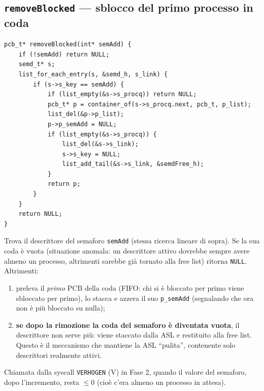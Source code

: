 \documentclass[11pt,a4paper]{article}
\newcommand{\code}[1]{\texttt{#1}}
\newcommand{\func}[1]{\textbf{\texttt{#1}}}
\begin{document}
\subsection{\func{removeBlocked} --- sblocco del primo processo in coda}
\begin{lstlisting}
pcb_t* removeBlocked(int* semAdd) {
    if (!semAdd) return NULL;
    semd_t* s;
    list_for_each_entry(s, &semd_h, s_link) {
        if (s->s_key == semAdd) {
            if (list_empty(&s->s_procq)) return NULL;
            pcb_t* p = container_of(s->s_procq.next, pcb_t, p_list);
            list_del(&p->p_list);
            p->p_semAdd = NULL;
            if (list_empty(&s->s_procq)) {
                list_del(&s->s_link);
                s->s_key = NULL;
                list_add_tail(&s->s_link, &semdFree_h);
            }
            return p;
        }
    }
    return NULL;
}
\end{lstlisting}
Trova il descrittore del semaforo \code{semAdd} (stessa ricerca lineare di
sopra). Se la sua coda è vuota (situazione anomala: un descrittore attivo
dovrebbe sempre avere almeno un processo, altrimenti sarebbe già tornato alla
free list) ritorna \code{NULL}. Altrimenti:
\begin{enumerate}
\item preleva il \emph{primo} PCB della coda (FIFO: chi si è bloccato per
  primo viene sbloccato per primo), lo stacca e azzera il suo
  \code{p\_semAdd} (segnalando che ora non è più bloccato su nulla);
\item \textbf{se dopo la rimozione la coda del semaforo è diventata vuota},
  il descrittore non serve più: viene staccato dalla ASL e restituito alla
  free list. Questo è il meccanismo che mantiene la ASL ``pulita'',
  contenente solo descrittori realmente attivi.
\end{enumerate}
Chiamata dalla syscall \code{VERHOGEN} (V) in Fase 2, quando il valore del
semaforo, dopo l'incremento, resta $\le 0$ (cioè c'era almeno un
processo in attesa).
\end{document}
